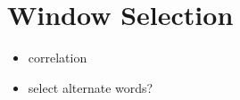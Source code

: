 \section{Window Selection}

\begin{itemize}
  \item correlation
  \item select alternate words?
\end{itemize}
